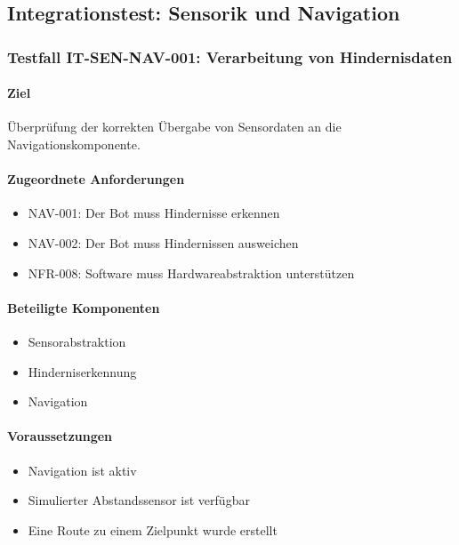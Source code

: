 \subsection{Integrationstest: Sensorik und
Navigation}\label{integrationstest-sensorik-und-navigation}

\subsubsection{Testfall IT-SEN-NAV-001: Verarbeitung von
Hindernisdaten}\label{testfall-it-sen-nav-001-verarbeitung-von-hindernisdaten}

\paragraph{Ziel}\label{ziel-9}

Überprüfung der korrekten Übergabe von Sensordaten an die
Navigationskomponente.

\paragraph{Zugeordnete Anforderungen}\label{zugeordnete-anforderungen-9}

\begin{itemize}
\tightlist
\item
  NAV-001: Der Bot muss Hindernisse erkennen
\item
  NAV-002: Der Bot muss Hindernissen ausweichen
\item
  NFR-008: Software muss Hardwareabstraktion unterstützen
\end{itemize}

\paragraph{Beteiligte Komponenten}\label{beteiligte-komponenten}

\begin{itemize}
\tightlist
\item
  Sensorabstraktion
\item
  Hinderniserkennung
\item
  Navigation
\end{itemize}

\paragraph{Voraussetzungen}\label{voraussetzungen-9}

\begin{itemize}
\tightlist
\item
  Navigation ist aktiv
\item
  Simulierter Abstandssensor ist verfügbar
\item
  Eine Route zu einem Zielpunkt wurde erstellt
\end{itemize}

